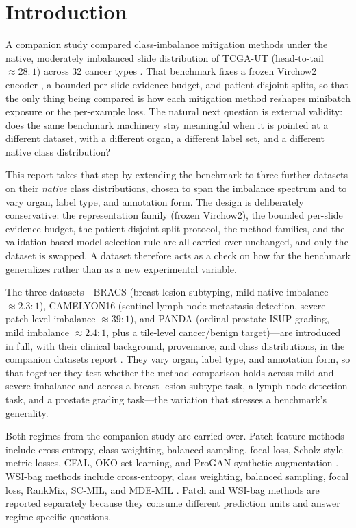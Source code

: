 \documentclass[11pt]{article}
\begin{document}
\setcounter{tocdepth}{2}
\tableofcontents
\clearpage

\section{Introduction}
A companion study compared class-imbalance mitigation methods under the native, moderately imbalanced slide distribution of TCGA-UT (head-to-tail ${\approx}28{:}1$) across 32 cancer types \citep{queisler2026imbalanceTCGA,tomczak2015reviewThe,komura2022universalEncoding}. That benchmark fixes a frozen Virchow2 encoder \citep{vorontsov2024virchow,zimmermann2024virchow2}, a bounded per-slide evidence budget, and patient-disjoint splits, so that the only thing being compared is how each mitigation method reshapes minibatch exposure or the per-example loss. The natural next question is external validity: does the same benchmark machinery stay meaningful when it is pointed at a different dataset, with a different organ, a different label set, and a different native class distribution?

This report takes that step by extending the benchmark to three further datasets on their \emph{native} class distributions, chosen to span the imbalance spectrum and to vary organ, label type, and annotation form. The design is deliberately conservative: the representation family (frozen Virchow2), the bounded per-slide evidence budget, the patient-disjoint split protocol, the method families, and the validation-based model-selection rule are all carried over unchanged, and only the dataset is swapped. A dataset therefore acts as a check on how far the benchmark generalizes rather than as a new experimental variable.

The three datasets---BRACS (breast-lesion subtyping, mild native imbalance ${\approx}2.3{:}1$), CAMELYON16 (sentinel lymph-node metastasis detection, severe patch-level imbalance ${\approx}39{:}1$), and PANDA (ordinal prostate ISUP grading, mild imbalance ${\approx}2.4{:}1$, plus a tile-level cancer/benign target)---are introduced in full, with their clinical background, provenance, and class distributions, in the companion datasets report \citep{queisler2026datasets}. They vary organ, label type, and annotation form, so that together they test whether the method comparison holds across mild and severe imbalance and across a breast-lesion subtype task, a lymph-node detection task, and a prostate grading task---the variation that stresses a benchmark's generality.

Both regimes from the companion study are carried over. Patch-feature methods include cross-entropy, class weighting, balanced sampling, focal loss, Scholz-style metric losses, CFAL, OKO set learning, and ProGAN synthetic augmentation \citep{scholz2024imbalanceAware}. WSI-bag methods include cross-entropy, class weighting, balanced sampling, focal loss, RankMix, SC-MIL, and MDE-MIL \citep{chen2023rankmix,juyal2024scMil,ling2025mdeMil}. Patch and WSI-bag methods are reported separately because they consume different prediction units and answer regime-specific questions.
\end{document}
